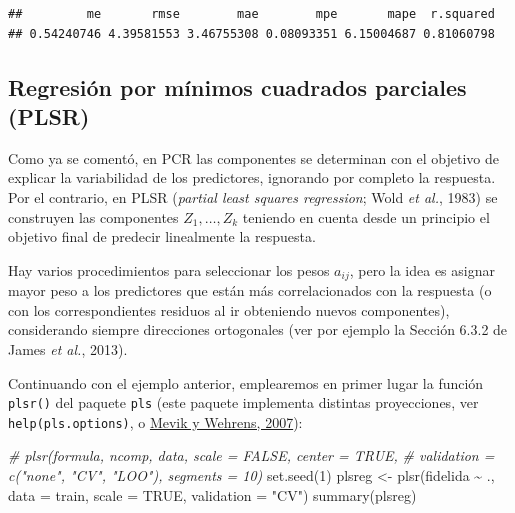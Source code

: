 \documentclass[
]{book}
\newenvironment{Shaded}{\begin{snugshade}}{\end{snugshade}}
\newcommand{\AttributeTok}[1]{\textcolor[rgb]{0.77,0.63,0.00}{#1}}
\newcommand{\CommentTok}[1]{\textcolor[rgb]{0.56,0.35,0.01}{\textit{#1}}}
\newcommand{\ConstantTok}[1]{\textcolor[rgb]{0.00,0.00,0.00}{#1}}
\newcommand{\DecValTok}[1]{\textcolor[rgb]{0.00,0.00,0.81}{#1}}
\newcommand{\FunctionTok}[1]{\textcolor[rgb]{0.00,0.00,0.00}{#1}}
\newcommand{\NormalTok}[1]{#1}
\newcommand{\OtherTok}[1]{\textcolor[rgb]{0.56,0.35,0.01}{#1}}
\newcommand{\SpecialCharTok}[1]{\textcolor[rgb]{0.00,0.00,0.00}{#1}}
\newcommand{\StringTok}[1]{\textcolor[rgb]{0.31,0.60,0.02}{#1}}
\theoremstyle{break}
\theoremstyle{definition}
\theoremstyle{definition}
\theoremstyle{definition}
\theoremstyle{definition}
\theoremstyle{remark}
\begin{document}
\begin{verbatim}
##         me       rmse        mae        mpe       mape  r.squared 
## 0.54240746 4.39581553 3.46755308 0.08093351 6.15004687 0.81060798
\end{verbatim}

\hypertarget{regresiuxf3n-por-muxednimos-cuadrados-parciales-plsr}{%
\subsection{Regresión por mínimos cuadrados parciales (PLSR)}\label{regresiuxf3n-por-muxednimos-cuadrados-parciales-plsr}}

Como ya se comentó, en PCR las componentes se determinan con el objetivo de explicar la variabilidad de los predictores, ignorando por completo la respuesta.
Por el contrario, en PLSR (\emph{partial least squares regression}; Wold \emph{et al.}, 1983) se construyen las componentes \(Z_1, \ldots, Z_k\) teniendo en cuenta desde un principio el objetivo final de predecir linealmente la respuesta.

Hay varios procedimientos para seleccionar los pesos \(a_{ij}\), pero la idea es asignar mayor peso a los predictores que están más correlacionados con la respuesta (o con los correspondientes residuos al ir obteniendo nuevos componentes), considerando siempre direcciones ortogonales (ver por ejemplo la Sección 6.3.2 de James \emph{et al.}, 2013).

Continuando con el ejemplo anterior, emplearemos en primer lugar la función \texttt{plsr()} del paquete \texttt{pls} (este paquete implementa distintas proyecciones, ver \texttt{help(pls.options)}, o \href{https://www.jstatsoft.org/article/view/v018i02}{Mevik y Wehrens, 2007}):

\begin{Shaded}
\begin{Highlighting}[]
\CommentTok{\# plsr(formula, ncomp, data, scale = FALSE, center = TRUE, }
\CommentTok{\#      validation = c("none", "CV", "LOO"), segments = 10)}
\FunctionTok{set.seed}\NormalTok{(}\DecValTok{1}\NormalTok{)}
\NormalTok{plsreg }\OtherTok{\textless{}{-}} \FunctionTok{plsr}\NormalTok{(fidelida }\SpecialCharTok{\textasciitilde{}}\NormalTok{ ., }\AttributeTok{data =}\NormalTok{ train, }\AttributeTok{scale =} \ConstantTok{TRUE}\NormalTok{, }\AttributeTok{validation =} \StringTok{"CV"}\NormalTok{)}
\FunctionTok{summary}\NormalTok{(plsreg)}
\end{Highlighting}
\end{Shaded}
\end{document}
